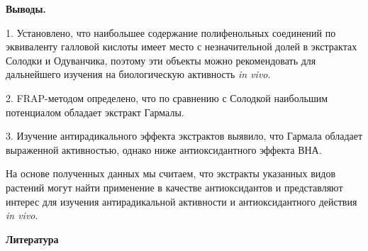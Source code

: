 \begin{multicols}{2}
{\bfseries Выводы.}

1. Установлено, что наибольшее содержание полифенольных соединений по
эквиваленту галловой кислоты имеет место с незначительной долей в
экстрактах Солодки и Одуванчика, поэтому эти объекты можно рекомендовать
для дальнейшего изучения на биологическую активность \emph{in vivo}.

2. FRAP-методом определено, что по сравнению с Солодкой наибольшим
потенциалом обладает экстракт Гармалы.

3. Изучение антирадикального эффекта экстрактов выявило, что Гармала
обладает выраженной активностью, однако ниже антиоксидантного эффекта
ВНА.

На основе полученных данных мы считаем, что экстракты указанных видов
растений могут найти применение в качестве антиоксидантов и представляют
интерес для изучения антирадикальной активности и антиоксидантного
действия \emph{in vivo}.
\end{multicols}

\begin{center}
{\bfseries Литература}
\end{center}

